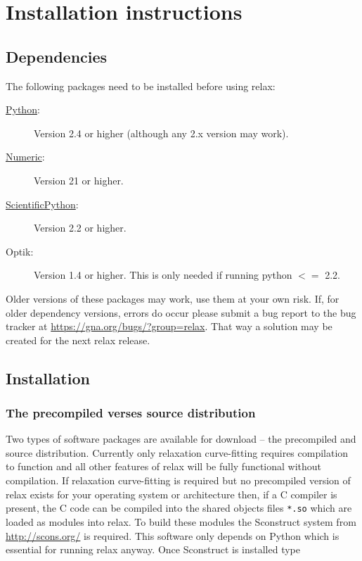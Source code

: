 
\chapter{Installation instructions}



\section{Dependencies}

The following packages need to be installed before using relax:

\begin{description}
\item[\href{http://python.org/}{Python}:]  Version 2.4 or higher (although any 2.x version may work).
\item[\href{http://numpy.scipy.org/}{Numeric}:]  Version 21 or higher.
\item[\href{http://starship.python.net/~hinsen/ScientificPython/}{ScientificPython}:]  Version 2.2 or higher.
\item[Optik:]  Version 1.4 or higher.  This is only needed if running python $<=$ 2.2.
\end{description}

Older versions of these packages may work, use them at your own risk.  If, for older dependency versions, errors do occur please submit a bug report to the bug tracker at \href{https://gna.org/bugs/?group=relax}{https://gna.org/bugs/?group=relax}.  That way a solution may be created for the next relax release.




\section{Installation}


\subsection{The precompiled verses source distribution}

Two types of software packages are available for download -- the precompiled and source distribution.  Currently only relaxation curve-fitting requires compilation to function and all other features of relax will be fully functional without compilation.  If relaxation curve-fitting is required but no precompiled version of relax exists for your operating system or architecture then, if a C compiler is present, the C code can be compiled into the shared objects files \texttt{*.so} which are loaded as modules into relax.  To build these modules the Sconstruct system from \href{http://scons.org/}{http://scons.org/} is required.  This software only depends on Python which is essential for running relax anyway.  Once Sconstruct is installed type

